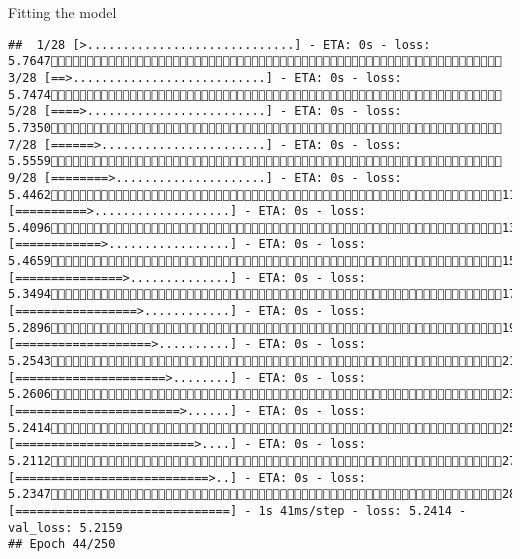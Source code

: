 \documentclass[
  ignorenonframetext,
]{beamer}
\begin{document}
\begin{frame}[fragile]{Fitting the model}
\begin{verbatim}
##  1/28 [>.............................] - ETA: 0s - loss: 5.7647 3/28 [==>...........................] - ETA: 0s - loss: 5.7474 5/28 [====>.........................] - ETA: 0s - loss: 5.7350 7/28 [======>.......................] - ETA: 0s - loss: 5.5559 9/28 [========>.....................] - ETA: 0s - loss: 5.446211/28 [==========>...................] - ETA: 0s - loss: 5.409613/28 [============>.................] - ETA: 0s - loss: 5.465915/28 [===============>..............] - ETA: 0s - loss: 5.349417/28 [=================>............] - ETA: 0s - loss: 5.289619/28 [===================>..........] - ETA: 0s - loss: 5.254321/28 [=====================>........] - ETA: 0s - loss: 5.260623/28 [=======================>......] - ETA: 0s - loss: 5.241425/28 [=========================>....] - ETA: 0s - loss: 5.211227/28 [===========================>..] - ETA: 0s - loss: 5.234728/28 [==============================] - 1s 41ms/step - loss: 5.2414 - val_loss: 5.2159
## Epoch 44/250

\end{verbatim}
\end{frame}
\end{document}

